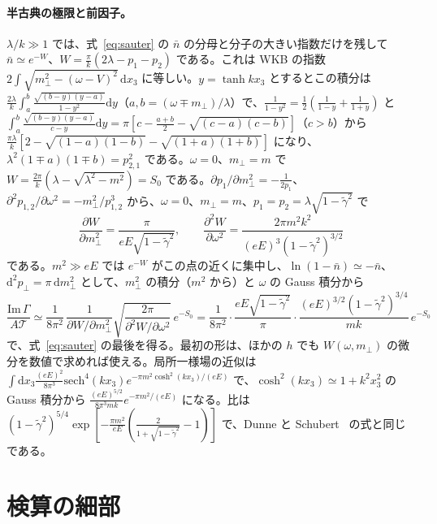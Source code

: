 \documentclass[a4paper,10pt]{ltjsarticle}
\newcommand{\dd}{\mathrm{d}}
\begin{document}
\paragraph{半古典の極限と前因子。}$\lambda/k\gg1$ では、式~\eqref{eq:sauter} の $\bar n$ の分母と分子の大きい指数だけを残して $\bar n\simeq e^{-W}$、$W=\frac\pi k(2\lambda-p_1-p_2)$ である。これは WKB の指数 $2\int\sqrt{m_\perp^2-(\omega-V)^2}\,\dd x_3$ に等しい。$y=\tanh kx_3$ とするとこの積分は $\frac{2\lambda}{k}\int_a^b\frac{\sqrt{(b-y)(y-a)}}{1-y^2}\dd y$（$a,b=(\omega\mp m_\perp)/\lambda$）で、$\frac{1}{1-y^2}=\frac12(\frac{1}{1-y}+\frac{1}{1+y})$ と $\int_a^b\frac{\sqrt{(b-y)(y-a)}}{c-y}\dd y=\pi[c-\frac{a+b}{2}-\sqrt{(c-a)(c-b)}]$（$c>b$）から $\frac{\pi\lambda}{k}[2-\sqrt{(1-a)(1-b)}-\sqrt{(1+a)(1+b)}]$ になり、$\lambda^2(1\mp a)(1\mp b)=p_{2,1}^2$ である。$\omega=0$、$m_\perp=m$ で $W=\frac{2\pi}{k}(\lambda-\sqrt{\lambda^2-m^2})=S_0$ である。$\partial p_1/\partial m_\perp^2=-\frac{1}{2p_1}$、$\partial^2p_{1,2}/\partial\omega^2=-m_\perp^2/p_{1,2}^3$ から、$\omega=0$、$m_\perp=m$、$p_1=p_2=\lambda\sqrt{1-\tilde\gamma^2}$ で
\begin{equation*}
\frac{\partial W}{\partial m_\perp^2}=\frac{\pi}{eE\sqrt{1-\tilde\gamma^2}},\qquad
\frac{\partial^2W}{\partial\omega^2}=\frac{2\pi m^2k^2}{(eE)^3(1-\tilde\gamma^2)^{3/2}}
\end{equation*}
である。$m^2\gg eE$ では $e^{-W}$ がこの点の近くに集中し、$\ln(1-\bar n)\simeq-\bar n$、$\dd^2p_\perp=\pi\,\dd m_\perp^2$ として、$m_\perp^2$ の積分（$m^2$ から）と $\omega$ の Gauss 積分から
\begin{equation*}
\frac{\mathrm{Im}\,\Gamma}{A\mathcal T}\simeq\frac{1}{8\pi^2}\,\frac{1}{\partial W/\partial m_\perp^2}\sqrt{\frac{2\pi}{\partial^2W/\partial\omega^2}}\,e^{-S_0}
=\frac{1}{8\pi^2}\cdot\frac{eE\sqrt{1-\tilde\gamma^2}}{\pi}\cdot\frac{(eE)^{3/2}(1-\tilde\gamma^2)^{3/4}}{mk}\,e^{-S_0}
\end{equation*}
で、式~\eqref{eq:sauter} の最後を得る。最初の形は、ほかの $h$ でも $W(\omega,m_\perp)$ の微分を数値で求めれば使える。局所一様場の近似は $\int\dd x_3\frac{(eE)^2}{8\pi^3}\mathrm{sech}^4(kx_3)e^{-\pi m^2\cosh^2(kx_3)/(eE)}$ で、$\cosh^2(kx_3)\simeq1+k^2x_3^2$ の Gauss 積分から $\frac{(eE)^{5/2}}{8\pi^3mk}e^{-\pi m^2/(eE)}$ になる。比は $(1-\tilde\gamma^2)^{5/4}\exp[-\frac{\pi m^2}{eE}(\frac{2}{1+\sqrt{1-\tilde\gamma^2}}-1)]$ で、Dunne と Schubert~\cite{ds05} の式と同じである。

\section{検算の細部}\label{app:details}
\end{document}
